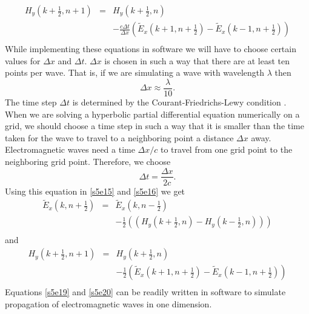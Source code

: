 \documentclass[11pt]{article}
\numberwithin{equation}{section}
\begin{document}
\begin{eqnarray}
H_y\left(k+\frac{1}{2},n+1\right) &=& H_y\left(k+\frac{1}{2}, n\right) 
\nonumber \\
 & & -\frac{c \Delta t}{\Delta x}\left(
\tilde{E}_x\left(k + 1, n + \frac{1}{2}\right) - \tilde{E}_x\left(k - 1, n+\frac{1}{2}\right)
\right) \nonumber \\
 & & \label{s5e16}
\end{eqnarray}
While implementing these equations in software we will have to choose certain
values for $\Delta x$ and $\Delta t$. $\Delta x$ is chosen in such a way that
there are at least ten points per wave. That is, if we are simulating a wave
with wavelength $\lambda$ then \cite{sullivan2013electromagnetic}
\begin{equation}\label{s5e17}
\Delta x \approx \frac{\lambda}{10}.
\end{equation}
The time step $\Delta t$ is determined by the Courant-Friedrichs-Lewy condition
\cite{cfl}. When we are solving a hyperbolic partial differential equation
numerically on a grid, we should choose a time step in such a way that it is
smaller than the time taken for the wave to travel to a neighboring point
a distance $\Delta x$ away. Electromagnetic waves need a time $\Delta x/c$
to travel from one grid point to the neighboring grid point. Therefore, we
choose 
\begin{equation}\label{s5e18}
\Delta t = \frac{\Delta x}{2c}.
\end{equation}
Using this equation in \eqref{s5e15} and \eqref{s5e16} we get
\begin{eqnarray}
\tilde{E}_x\left(k ,n+\frac{1}{2}\right) &=& \tilde{E}_x\left(k ,
n-\frac{1}{2}\right) \nonumber \\
 & & -\frac{1}{2}\left(\left(
H_y\left(k + \frac{1}{2}, n\right) - H_y\left(k - \frac{1}{2}, n\right)\right)
\right) \nonumber \\
 & & \label{s5e19}
\end{eqnarray}
and
\begin{eqnarray}
H_y\left(k+\frac{1}{2},n+1\right) &=& H_y\left(k+\frac{1}{2}, n\right) 
\nonumber \\
 & & -\frac{1}{2}\left(
\tilde{E}_x\left(k + 1, n + \frac{1}{2}\right) - \tilde{E}_x\left(k - 1, n+\frac{1}{2}\right)
\right) \nonumber \\
 & & \label{s5e20}
\end{eqnarray}
Equations \eqref{s5e19} and \eqref{s5e20} can be readily written in software
to simulate propagation of electromagnetic waves in one dimension.
\end{document}
